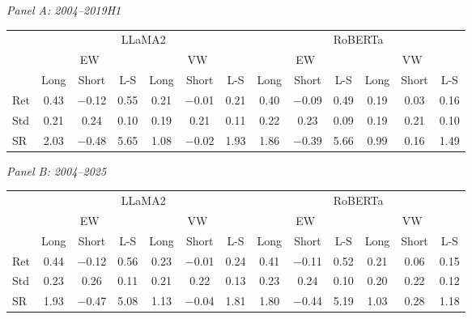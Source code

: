 \begin{table}[htbp]
{\footnotesize
\textit{Panel A: 2004--2019H1}\\[2pt]
\begin{adjustbox}{max width=\linewidth, max totalheight=0.28\textheight}
\begin{tabular}{lcccccccccccc}
\toprule
 & \multicolumn{6}{c}{LLaMA2} & \multicolumn{6}{c}{RoBERTa} \\
\cmidrule(lr){2-7} \cmidrule(lr){8-13}
 & \multicolumn{3}{c}{EW} & \multicolumn{3}{c}{VW} & \multicolumn{3}{c}{EW} & \multicolumn{3}{c}{VW} \\
\cmidrule(lr){2-4} \cmidrule(lr){5-7} \cmidrule(lr){8-10} \cmidrule(lr){11-13}
 & Long & Short & L-S & Long & Short & L-S & Long & Short & L-S & Long & Short & L-S \\
\midrule
Ret & 0.43 & $-$0.12 & 0.55 & 0.21 & $-$0.01 & 0.21 & 0.40 & $-$0.09 & 0.49 & 0.19 & 0.03 & 0.16 \\
Std & 0.21 & \phantom{$-$}0.24 & 0.10 & 0.19 & \phantom{$-$}0.21 & 0.11 & 0.22 & \phantom{$-$}0.23 & 0.09 & 0.19 & 0.21 & 0.10 \\
SR & 2.03 & $-$0.48 & 5.65 & 1.08 & $-$0.02 & 1.93 & 1.86 & $-$0.39 & 5.66 & 0.99 & 0.16 & 1.49 \\
\bottomrule
\end{tabular}
\end{adjustbox}
\par\medskip
\textit{Panel B: 2004--2025}\\[2pt]
\begin{adjustbox}{max width=\linewidth, max totalheight=0.28\textheight}
\begin{tabular}{lcccccccccccc}
\toprule
 & \multicolumn{6}{c}{LLaMA2} & \multicolumn{6}{c}{RoBERTa} \\
\cmidrule(lr){2-7} \cmidrule(lr){8-13}
 & \multicolumn{3}{c}{EW} & \multicolumn{3}{c}{VW} & \multicolumn{3}{c}{EW} & \multicolumn{3}{c}{VW} \\
\cmidrule(lr){2-4} \cmidrule(lr){5-7} \cmidrule(lr){8-10} \cmidrule(lr){11-13}
 & Long & Short & L-S & Long & Short & L-S & Long & Short & L-S & Long & Short & L-S \\
\midrule
Ret & 0.44 & $-$0.12 & 0.56 & 0.23 & $-$0.01 & 0.24 & 0.41 & $-$0.11 & 0.52 & 0.21 & 0.06 & 0.15 \\
Std & 0.23 & \phantom{$-$}0.26 & 0.11 & 0.21 & \phantom{$-$}0.22 & 0.13 & 0.23 & \phantom{$-$}0.24 & 0.10 & 0.20 & 0.22 & 0.12 \\
SR & 1.93 & $-$0.47 & 5.08 & 1.13 & $-$0.04 & 1.81 & 1.80 & $-$0.44 & 5.19 & 1.03 & 0.28 & 1.18 \\
\bottomrule
\end{tabular}
\end{adjustbox}
}
\end{table}

